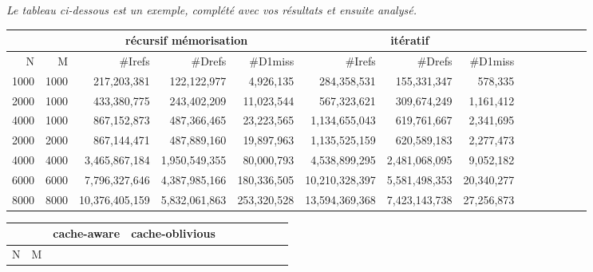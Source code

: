 \documentclass[10pt,a4paper]{article}
\begin{document}
{{\em Le tableau ci-dessous est un exemple, complété avec vos résultats et ensuite analysé.}
\\
{\footnotesize
\begin{tabular}{|r|r||r|r|r||r|r|r||r|r|r||r|r|r||}
\hline
 \multicolumn{2}{|c||}{ } 
& \multicolumn{3}{c||}{récursif mémorisation}
& \multicolumn{3}{c||}{itératif}
\\ \hline
N & M 
& \#Irefs & \#Drefs & \#D1miss %
& \#Irefs & \#Drefs & \#D1miss %

\\ \hline
\hline
1000 & 1000 
& 217,203,381  & 122,122,977  & 4,926,135  %
& 284,358,531 & 155,331,347 & 578,335  %

\\ \hline
2000 & 1000 
& 433,380,775  & 243,402,209 & 11,023,544  %
& 567,323,621 & 309,674,249 & 1,161,412  %

\\ \hline
4000 & 1000 
& 867,152,873 & 487,366,465  & 23,223,565   %
& 1,134,655,043 & 619,761,667  & 2,341,695  %

\\ \hline
2000 & 2000 
& 867,144,471  & 487,889,160  & 19,897,963   %
& 1,135,525,159 & 620,589,183 & 2,277,473  %

\\ \hline
4000 & 4000 
& 3,465,867,184 & 1,950,549,355 & 80,000,793   %
& 4,538,899,295 & 2,481,068,095 & 9,052,182  %

\\ \hline
6000 & 6000 
& 7,796,327,646 & 4,387,985,166 & 180,336,505  %
& 10,210,328,397 & 5,581,498,353 & 20,340,277  %

\\ \hline
8000 & 8000 
& 10,376,405,159 & 5,832,061,863 & 253,320,528  %
& 13,594,369,368 & 7,423,143,738  & 27,256,873  %

\\ \hline
\hline
\end{tabular}
}

\begin{tabular}{|r|r||r|r|r||r|r|r||r|r|r||r|r|r||}
  \hline
   \multicolumn{2}{|c||}{ }
   & \multicolumn{3}{c||}{cache-aware}
& \multicolumn{3}{c||}{cache-oblivious}
\\ \hline
N & M 


\end{tabular}}
\end{document}
